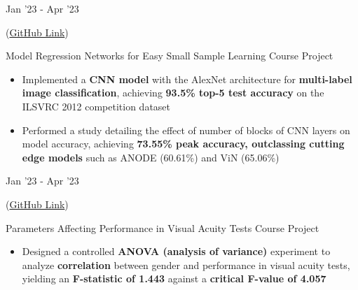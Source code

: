 \documentclass[9pt]{developercv}
\begin{document}
\begin{entrylist}
    \vspace{-5pt}

    \entry
        {Jan '23 - Apr '23 \newline\newline \vspace{-15pt}
        
        (\href{https://github.com/omprabhu31/iitb-projects/tree/main/ie506}{GitHub Link})}
		{Model Regression Networks for Easy Small Sample Learning}
		{Course Project}
		{\vspace{-9.5pt}
        \begin{itemize}[noitemsep, topsep=0pt, parsep=0pt, partopsep=0pt, leftmargin=9pt]
            \item Implemented a \textbf{CNN model} with the AlexNet architecture for \textbf{multi-label image classification}, achieving \textbf{93.5\% top-5 test accuracy} on the ILSVRC 2012 competition dataset
            \vspace{1.5pt}
            
            \item Performed a study detailing the effect of number of blocks of CNN layers on model accuracy, achieving \textbf{73.55\% peak accuracy, outclassing cutting edge models} such as ANODE (60.61\%) and ViN (65.06\%)
        \end{itemize}}
    \vspace{-5pt}
        
    \entry
        {Jan '23 - Apr '23 \newline\newline \vspace{-15pt}
        
        (\href{https://github.com/omprabhu31/iitb-projects/tree/main/me794}{GitHub Link})}
		{Parameters Affecting Performance in Visual Acuity Tests}
		{Course Project}
		{\vspace{-9.5pt}
        \begin{itemize}[noitemsep, topsep=0pt, parsep=0pt, partopsep=0pt, leftmargin=9pt]
            \item Designed a controlled \textbf{ANOVA (analysis of variance)} experiment to analyze \textbf{correlation} between gender and performance in visual acuity tests, yielding an \textbf{F-statistic of 1.443} against a \textbf{critical F-value of 4.057}
        \end{itemize}}
    \vspace{-5pt}
    

\end{entrylist}
\end{document}
